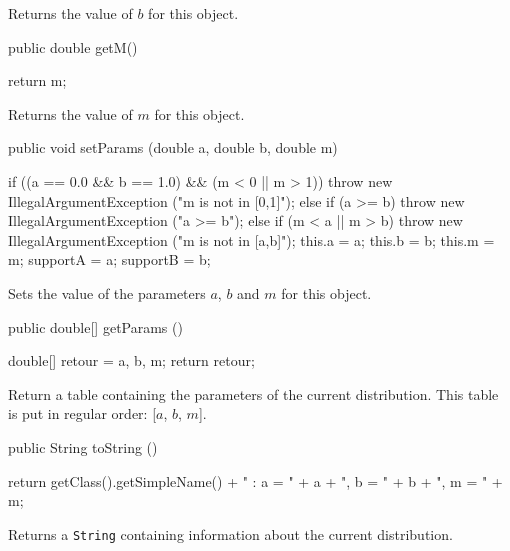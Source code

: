   \begin{tabb}
  Returns the value of $b$ for this object.
 \end{tabb}
\begin{code}      

   public double getM()\begin{hide} {
      return m;
   }\end{hide}
\end{code}
  \begin{tabb}
  Returns the value of $m$ for this object.
 \end{tabb}
\begin{code}      

   public void setParams (double a, double b, double m)\begin{hide} {
      if ((a == 0.0 && b == 1.0) && (m < 0 || m > 1))
         throw new IllegalArgumentException ("m is not in [0,1]");
      else if (a >= b)
         throw new IllegalArgumentException ("a >= b");
      else if (m < a || m > b) 
         throw new IllegalArgumentException ("m is not in [a,b]");
      this.a = a;
      this.b = b;
      this.m = m;
      supportA = a;
      supportB = b;
   }\end{hide}
\end{code}
  \begin{tabb}
  Sets the value of the parameters $a$, $b$ and $m$ for this object.
 \end{tabb}
\begin{code}

   public double[] getParams ()\begin{hide} {
      double[] retour = {a, b, m};
      return retour;
   }\end{hide}
\end{code}
\begin{tabb}
   Return a table containing the parameters of the current distribution.
   This table is put in regular order: [$a$, $b$, $m$].
\end{tabb}
\begin{code}

   public String toString ()\begin{hide} {
      return getClass().getSimpleName() + " : a = " + a + ", b = " + b + ", m = " + m;
   }\end{hide}
\end{code}
\begin{tabb}
   Returns a \texttt{String} containing information about the current distribution.
\end{tabb}
\begin{code}\begin{hide}
}\end{hide}
\end{code}
